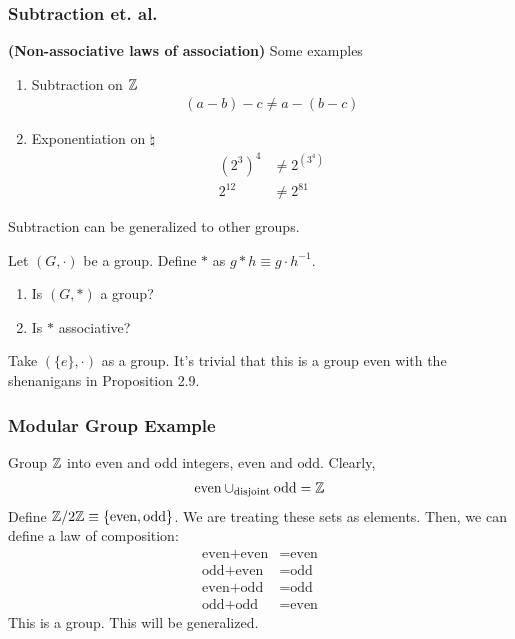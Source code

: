 \subsubsection{Subtraction et. al.}
\begin{example}
    \textbf{(Non-associative laws of association)} Some examples
    \begin{enumerate}
        \item Subtraction on $\mathbb{Z}$
        \begin{align}
            (a - b) - c \ne a - (b - c)
        \end{align}
        \item Exponentiation on $\natural$
        \begin{align}
            (2^3)^4 &\ne 2^{(3^4)}\\
            2^{12} &\ne 2^{81}
        \end{align}
    \end{enumerate}
\end{example}
Subtraction can be generalized to other groups.
\begin{proposition}
    Let $(G, \cdot)$ be a group. Define $*$ as $g * h \equiv g \cdot h^{-1}$. 
    \begin{enumerate}
        \item Is $(G, *)$ a group?
        \item Is $*$ associative?
    \end{enumerate}
\end{proposition}
\begin{example}
    Take $(\{ e \}, \cdot)$ as a group. It's trivial that this is a group even with the shenanigans in Proposition 2.9.
\end{example}

\subsubsection{Modular Group Example}
Group $\mathbb{Z}$ into even and odd integers, $\text{even}$ and $\text{odd}$. Clearly,
\begin{align}
    \text{even} \cup_{\text{disjoint}} \text{odd} = \mathbb{Z}
\end{align}
Define $\mathbb{Z} / 2 \mathbb{Z} \equiv \{ \text{even}, \text{odd} \}$. We are treating these sets as elements. Then, we can define a law of composition:
\begin{align}
    \text{even} + \text{even} &= \text{even}\\
    \text{odd} + \text{even} &= \text{odd}\\
    \text{even} + \text{odd} &= \text{odd}\\
    \text{odd} + \text{odd} &= \text{even}
\end{align}
This is a group. This will be generalized.